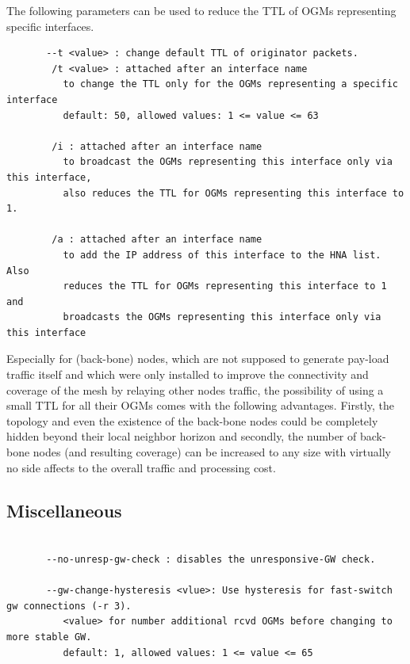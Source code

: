 \documentclass[11pt]{article}
\begin{document}
The following parameters can be used to reduce the TTL of OGMs representing specific interfaces.

\begin{small} \begin{verbatim}
       --t <value> : change default TTL of originator packets.
        /t <value> : attached after an interface name
          to change the TTL only for the OGMs representing a specific interface
          default: 50, allowed values: 1 <= value <= 63

        /i : attached after an interface name
          to broadcast the OGMs representing this interface only via this interface,
          also reduces the TTL for OGMs representing this interface to 1.

        /a : attached after an interface name
          to add the IP address of this interface to the HNA list. Also
          reduces the TTL for OGMs representing this interface to 1 and
          broadcasts the OGMs representing this interface only via this interface
\end{verbatim} \end{small}


Especially for (back-bone) nodes, which are not supposed to generate pay-load traffic itself and which were only installed to improve the connectivity and coverage of the mesh by relaying other nodes traffic, the possibility of using a small TTL for all their OGMs comes with the following advantages.
Firstly, the topology and even the existence of the back-bone nodes could be completely hidden beyond their local neighbor horizon and secondly, the number of back-bone nodes (and resulting coverage) can be increased to any size with virtually no side affects to the overall traffic and processing cost.


\subsection{Miscellaneous}


\begin{small} \begin{verbatim}

       --no-unresp-gw-check : disables the unresponsive-GW check.

       --gw-change-hysteresis <vlue>: Use hysteresis for fast-switch gw connections (-r 3).
          <value> for number additional rcvd OGMs before changing to more stable GW.
          default: 1, allowed values: 1 <= value <= 65

\end{verbatim} \end{small}
\end{document}
